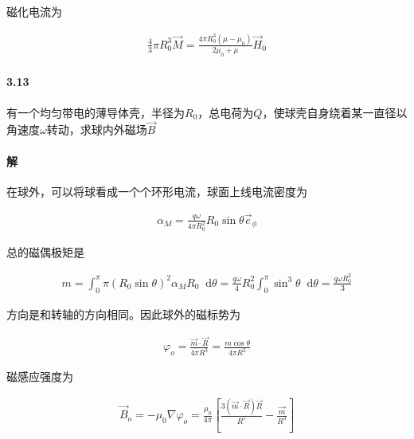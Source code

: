 \documentclass{article}
\newcommand*{\md}{\mathop{}\!\mathrm{d}}
\begin{document}
磁化电流为

\begin{equation*}
  \begin{aligned}
    \frac{4}{3} \pi R_0^3 \vec{M} = \frac{4 \pi R_0^3 \left( \mu - \mu_0 \right)}{2\mu_{0} + \mu} \vec{H}_0
  \end{aligned}
\end{equation*}

\paragraph{3.13}

有一个均匀带电的薄导体壳，半径为$R_0$，总电荷为$Q$，使球壳自身绕着某一直径以角速度$\omega$转动，求球内外磁场$\vec{B}$

\paragraph{解}

在球外，可以将球看成一个个环形电流，球面上线电流密度为

\begin{equation*}
  \begin{aligned}
    \alpha_M = \frac{q \omega}{4 \pi R_0^2} R_0 \sin \theta \vec{e}_{\phi}
  \end{aligned}
\end{equation*}

总的磁偶极矩是

\begin{equation*}
  \begin{aligned}
    m = \int_0^{\pi} \pi \left( R_0 \sin \theta \right)^2 \alpha_M R_0 \md \theta
    = \frac{q \omega}{4} R_0^2 \int_0^{\pi} \sin^3 \theta \md \theta
    = \frac{q \omega R_0^2}{3}
  \end{aligned}
\end{equation*}

方向是和转轴的方向相同。因此球外的磁标势为

\begin{equation*}
  \begin{aligned}
    \varphi_o = \frac{\vec{m} \cdot \vec{R}}{4\pi R^{3}} = \frac{m \cos \theta}{4 \pi R^{2}}
  \end{aligned}
\end{equation*}

磁感应强度为

\begin{equation*}
  \begin{aligned}
    \vec{B}_o = - \mu_0 \nabla \varphi_o = \frac{\mu_{0}}{4\pi} \left[ \frac{3 \left( \vec{m} \cdot \vec{R} \right)\vec{R}}{R^{5}} - \frac{\vec{m}}{R^{3}} \right] 
  \end{aligned}
\end{equation*}
\end{document}
